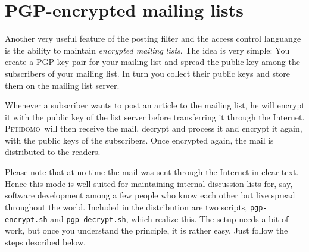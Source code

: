 \documentclass[a4paper]{report}
\newcommand{\Petidomo}{{\scshape Peti\-domo}}
\newcommand{\Def}[1]{{\index{#1}\sl #1}}
\newcommand{\file}[1]{{\tt #1}}
\begin{document}
\section{PGP-encrypted mailing lists}

Another very useful feature of the posting filter and the access
control languange is the ability to maintain \Def{encrypted mailing
lists}. The idea is very simple: You create a PGP key pair for your
mailing list and spread the public key among the subscribers of your
mailing list. In turn you collect their public keys and store them on
the mailing list server.

Whenever a subscriber wants to post an article to the mailing list, he
will encrypt it with the public key of the list server before
transferring it through the Internet. \Petidomo\ will then receive the
mail, decrypt and process it and encrypt it again, with the public
keys of the subscribers. Once encrypted again, the mail is distributed
to the readers.

Please note that at no time the mail was sent through the Internet in
clear text. Hence this mode is well-suited for maintaining internal
discussion lists for, say, software development among a few people who
know each other but live spread throughout the world. Included in the
distribution are two scripts, \file{pgp-encrypt.sh} and
\file{pgp-decrypt.sh}, which realize this. The setup needs a bit of
work, but once you understand the principle, it is rather easy. Just
follow the steps described below.
\end{document}
